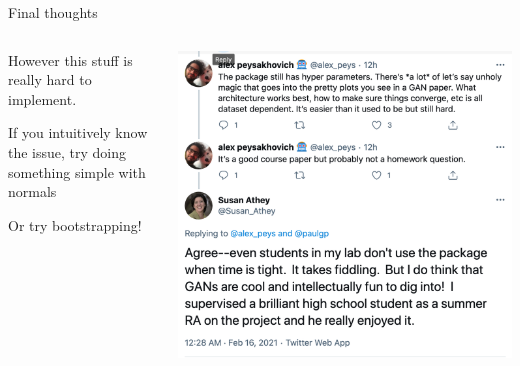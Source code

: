 \documentclass[notes,11pt, aspectratio=169]{beamer}
\newenvironment{wideitemize}{\itemize\addtolength{\itemsep}{10pt}}{\enditemize}
\begin{document}
\begin{frame}{Final thoughts}
\begin{columns}[T] %
\begin{column}{.5\textwidth}
  \begin{wideitemize}
  \item However this stuff is really hard to implement.
  \item If you intuitively know the issue, try doing something simple with normals
  \item Or try bootstrapping!
  \end{wideitemize}
  \end{column}
  \hfill%
  \begin{column}{.5\textwidth}
    \includegraphics[width=\linewidth]{gan_fiddle.png}
  \end{column}
  \end{columns}
\end{frame}
\end{document}

